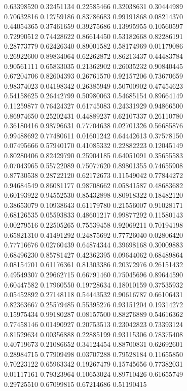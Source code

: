 \begin{figure}
   0.63398520   0.32451134
   0.22585466   0.32038631
   0.30444989   0.70632816
   0.12759186   0.83786683
   0.99191868   0.08214370
   0.44054365   0.37461659
   0.39275686   0.13995955
   0.10560597   0.72990512
   0.74428622   0.86614450
   0.53182668   0.82286191
   0.28773779   0.62426340
   0.89001582   0.58174969
   0.01179086   0.26922600
   0.89834064   0.62262872
   0.86213437   0.44483784
   0.90561111   0.65833035
   0.21362902   0.26035232
   0.90840445   0.67204706
   0.82604393   0.26761570
   0.92157206   0.73670659
   0.98374023   0.04198342
   0.26385949   0.50700902
   0.47454623   0.54158625
   0.26442799   0.50980063
   0.54685154   0.89664149
   0.11259877   0.76424327
   0.61745083   0.24331929
   0.94866500   0.86974650
   0.25202431   0.44889237
   0.62107337   0.26110780
   0.36180416   0.98796631
   0.77704638   0.02701326
   0.56685876   0.99488692
   0.77480611   0.01601242
   0.64442613   0.37578150
   0.07495666   0.57940170
   0.41085332   0.22882223
   0.12045149   0.80280406
   0.82429790   0.25904185
   0.64051091   0.35655583
   0.07043965   0.55722089
   0.75077620   0.89801355
   0.74655908   0.87730538
   0.28722120   0.62172673
   0.11549042   0.77844272
   0.94684549   0.86081177
   0.98708662   0.05841587
   0.48683682   0.60193922
   0.94552530   0.85432898
   0.80918322   0.18482120
   0.38653079   0.10938643
   0.61179780   0.21556007
   0.91028171   0.68126535
   0.05593833   0.48601217
   0.99877292   0.11580143
   0.00279516   0.22505265
   0.75539458   0.92069211
   0.70194198   0.65821310
   0.41491292   0.24875692
   0.77726040   0.02806420
   0.77716676   0.02760439
   0.64874344   0.39698168
   0.30009883   0.68496230
   0.85781427   0.42362395
   0.09644062   0.68489864
   0.08154701   0.61176361
   0.81303386   0.20372976
   0.26151432   0.49549307
   0.29662715   0.66791460
   0.75045696   0.89644590
   0.60447582   0.17960550
   0.19728634   0.18010159
   0.37535932   0.05452892
   0.27148118   0.54443532
   0.90616787   0.66106431
   0.82363667   0.25579485
   0.55395276   0.93151204
   0.19314272   0.15975434
   0.99180287   0.08157500
   0.88276889   0.54616362
   0.77458146   0.01490927
   0.20753513   0.23042823
   0.73393124   0.81529634
   0.00356888   0.22885199
   0.93115306   0.78375408
   0.40719673   0.21086652
   0.34124454   0.88700831
   0.62692601   0.28984715
   0.77909498   0.03707288
   0.79528184   0.11655850
   0.70223122   0.65963342
   0.19267479   0.15745656
   0.77382031   0.01117161
   0.79323964   0.10653024
   0.89710426   0.61655749
   0.29725510   0.67099815
   0.67214686   0.51190415

\end{figure}
